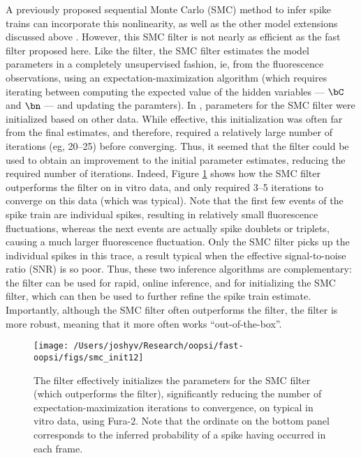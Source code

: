 A previously proposed sequential Monte Carlo (SMC) method to infer spike trains can incorporate this nonlinearity, as well as the other model extensions discussed above \cite{VogelsteinPaninski09} . However, this SMC filter is not nearly as efficient as the fast filter proposed here.  Like the \foopsi filter, the SMC filter estimates the model parameters in a completely unsupervised fashion, ie, from the fluorescence observations, using an expectation-maximization algorithm (which requires iterating between computing the expected value of the hidden variables --- $\bC$ and $\bn$ --- and updating the paramters).  In \cite{VogelsteinPaninski09}, parameters for the SMC filter were initialized based on other data.  While effective, this initialization was often far from the final estimates, and therefore, required a relatively large number of iterations (eg, 20--25) before converging.  Thus, it seemed that the \foopsi filter could be used to obtain an improvement to the initial parameter estimates, reducing the required number of iterations.  Indeed, Figure \ref{fig:smc_init} shows how the SMC filter outperforms the \foopsi filter on in vitro data, and only required 3--5 iterations to converge on this data (which was typical).  Note that the first few events of the spike train are individual spikes, resulting in relatively small fluorescence fluctuations, whereas the next events are actually spike doublets or triplets, causing a much larger fluorescence fluctuation.  Only the SMC filter picks up the individual spikes in this trace, a result typical when the effective signal-to-noise ratio (SNR) is so poor.  Thus, these two inference algorithms are complementary: the \foopsi filter can be used for rapid, online inference, and for initializing the SMC filter, which can then be used to further refine the spike train estimate.  Importantly, although the SMC filter often outperforms the \foopsi filter, the \foopsi filter is more robust, meaning that it more often works ``out-of-the-box''.

\begin{figure}[h!]
\centering \texttt{[image: /Users/joshyv/Research/oopsi/fast-oopsi/figs/smc\_init12]}
\caption[\foopsi filter can initialize Wiener filter]{The \foopsi filter effectively initializes the parameters for the SMC filter (which outperforms the \foopsi filter), significantly reducing the number of expectation-maximization iterations to convergence, on typical in vitro data, using Fura-2.  Note that the ordinate on the bottom panel corresponds to the inferred probability of a spike having occurred in each frame.} \label{fig:smc_init}
\end{figure}

